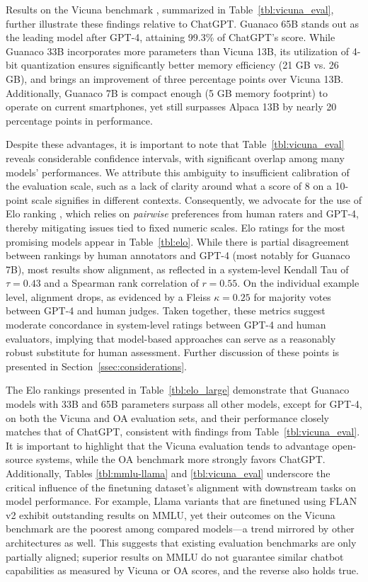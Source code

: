 Results on the Vicuna benchmark \cite{vicuna2023}, summarized in Table~\ref{tbl:vicuna_eval}, further illustrate these findings relative to ChatGPT. {Guanaco} 65B stands out as the leading model after GPT-4, attaining 99.3\% of ChatGPT’s score. While {Guanaco} 33B incorporates more parameters than Vicuna 13B, its utilization of 4-bit quantization ensures significantly better memory efficiency (21 GB vs. 26 GB), and brings an improvement of three percentage points over Vicuna 13B. Additionally, {Guanaco} 7B is compact enough (5 GB memory footprint) to operate on current smartphones, yet still surpasses Alpaca 13B by nearly 20 percentage points in performance.

Despite these advantages, it is important to note that Table~\ref{tbl:vicuna_eval} reveals considerable confidence intervals, with significant overlap among many models' performances. We attribute this ambiguity to insufficient calibration of the evaluation scale, such as a lack of clarity around what a score of 8 on a 10-point scale signifies in different contexts. Consequently, we advocate for the use of Elo ranking \citep{elo1967proposed}, which relies on \textit{pairwise} preferences from human raters and GPT-4, thereby mitigating issues tied to fixed numeric scales. Elo ratings for the most promising models appear in Table~\ref{tbl:elo}. While there is partial disagreement between rankings by human annotators and GPT-4 (most notably for Guanaco 7B), most results show alignment, as reflected in a system-level Kendall Tau of $\tau=0.43$ and a Spearman rank correlation of $r=0.55$. On the individual example level, alignment drops, as evidenced by a Fleiss $\kappa=0.25$ for majority votes between GPT-4 and human judges. Taken together, these metrics suggest moderate concordance in system-level ratings between GPT-4 and human evaluators, implying that model-based approaches can serve as a reasonably robust substitute for human assessment. Further discussion of these points is presented in Section~\ref{ssec:considerations}.

The Elo rankings presented in Table~\ref{tbl:elo_large} demonstrate that {Guanaco} models with 33B and 65B parameters surpass all other models, except for GPT-4, on both the Vicuna and OA evaluation sets, and their performance closely matches that of ChatGPT, consistent with findings from Table~\ref{tbl:vicuna_eval}. It is important to highlight that the Vicuna evaluation tends to advantage open-source systems, while the OA benchmark more strongly favors ChatGPT. Additionally, Tables \ref{tbl:mmlu-llama} and \ref{tbl:vicuna_eval} underscore the critical influence of the finetuning dataset's alignment with downstream tasks on model performance. For example, Llama variants that are finetuned using FLAN v2 exhibit outstanding results on MMLU, yet their outcomes on the Vicuna benchmark are the poorest among compared models—a trend mirrored by other architectures as well. This suggests that existing evaluation benchmarks are only partially aligned; superior results on MMLU do not guarantee similar chatbot capabilities as measured by Vicuna or OA scores, and the reverse also holds true.

